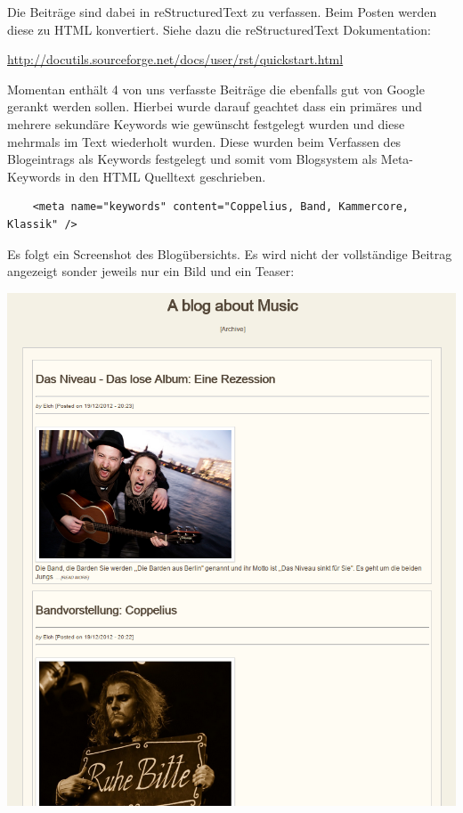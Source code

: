 Die Beiträge sind dabei in reStructuredText zu verfassen. Beim Posten werden
diese zu HTML konvertiert. Siehe dazu die reStructuredText Dokumentation:

\begin{center}
\url{http://docutils.sourceforge.net/docs/user/rst/quickstart.html}
\end{center}

Momentan enthält 4 von uns verfasste Beiträge die ebenfalls gut von Google
gerankt werden sollen. Hierbei wurde darauf geachtet dass ein primäres und
mehrere sekundäre Keywords wie gewünscht festgelegt wurden und diese mehrmals im
Text wiederholt wurden. Diese wurden beim Verfassen des Blogeintrags als
Keywords festgelegt und somit vom Blogsystem als Meta-Keywords in den HTML
Quelltext geschrieben.

\begin{verbatim}
    <meta name="keywords" content="Coppelius, Band, Kammercore, Klassik" />
\end{verbatim}

Es folgt ein Screenshot des Blogübersichts. Es wird nicht der vollständige
Beitrag angezeigt sonder jeweils nur ein Bild und ein Teaser:

\begin{center}
\includegraphics[width=\textwidth]{../screenshots/blog_overview.png}
\end{center}

